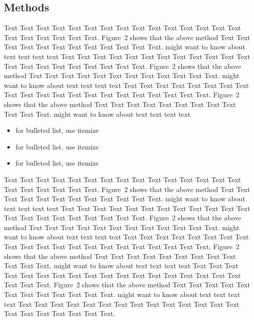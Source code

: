 \documentclass{bioinfo}
\begin{document}
\begin{methods}
\section{Methods}

Text Text Text Text Text Text  Text Text Text Text Text Text Text
Text Text  Text Text Text Text Text Text.
Figure~2\vphantom{\ref{fig:02}} shows that the above method  Text
Text Text Text  Text Text Text Text Text Text  Text Text.
\citealp{Boffelli03} might want to know about  text text text text
Text Text Text Text Text Text Text Text Text Text Text Text Text
Text Text  Text Text Text Text Text Text.
Figure~2\vphantom{\ref{fig:02}} shows that the above method  Text
Text Text Text Text Text Text Text Text Text  Text Text.
\citealp{Boffelli03} might want to know about text text text text
Text Text Text Text Text Text  Text Text Text Text Text Text Text
Text Text Text Text Text Text Text Text.
Figure~2\vphantom{\ref{fig:02}} shows that the above method  Text
Text Text Text Text Text Text Text Text Text  Text Text.
\citealp{Boffelli03} might want to know about text text text
text\vspace*{1pt}

\begin{itemize}
\item for bulleted list, use itemize
\item for bulleted list, use itemize
\item for bulleted list, use itemize\vspace*{1pt}
\end{itemize}

Text Text Text Text Text Text  Text Text Text Text Text Text Text
Text Text  Text Text Text Text Text Text.
Figure~2\vphantom{\ref{fig:02}} shows that the above method  Text
Text Text Text  Text Text Text Text Text Text  Text Text.
\citealp{Boffelli03} might want to know about  text text text text
Text Text Text Text Text Text Text Text Text Text Text Text Text
Text Text Text Text Text Text Text Text.
Figure~2\vphantom{\ref{fig:02}} shows that the above method  Text
Text Text Text Text Text Text Text Text Text  Text Text.
\citealp{Boffelli03} might want to know about text text text text
Text Text Text Text Text Text  Text Text Text Text Text Text Text
Text Text Text Text Text Text Text Text.
Figure~2\vphantom{\ref{fig:02}} shows that the above method  Text
Text Text Text Text Text Text Text Text Text  Text Text.
\citealp{Boffelli03} might want to know about text text text text
Text Text Text Text Text Text  Text Text Text Text Text Text Text
Text Text Text Text Text Text Text Text.
Figure~2\vphantom{\ref{fig:02}} shows that the above method Text
Text Text Text Text Text Text Text Text Text Text Text.
\citealp{Boffelli03} might want to know about text text text text
Text Text Text Text Text Text  Text Text Text Text Text Text Text
Text Text Text Text Text Text Text Text.


\end{methods}
\end{document}
